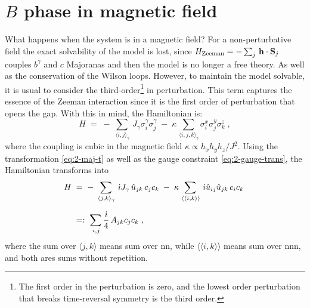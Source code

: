 


\section[B phase in a magnetic field]{$B$ phase in magnetic field}

What happens when the system is in a magnetic field? For a non-perturbative field the exact solvability of the model is lost, since $H_\text{Zeeman} = -\sum_j \,  \bf{h} \cdot \bf{S}_j $ couples $b^\gamma$ and $c$ Majoranas and then the model is no longer a free theory. As well as the conservation of the Wilson loops. %
However,  to maintain the model solvable, it is usual to consider the third-order\footnote{The first order in the  perturbation is zero, and the lowest order perturbation that breaks time-reversal symmetry is the third order.} in perturbation. This term captures the essence of the Zeeman interaction since it is the first order of perturbation that opens the gap. With this in mind, the Hamiltonian is: 
\begin{equation}
    H \; = \; -  \, \sum_{\, \langle i,j \rangle_{\gamma} }  \, J_{\gamma} \sigma_{i}^{\gamma} \sigma_{j}^{\gamma}    \; - \; \kappa  \sum_{ \,  \langle i,j,k \rangle_{\gamma} }   \sigma_{i}^{x} \sigma_{j}^{y} \sigma_{k}^{z} \; , \label{2-Ham-mag}
\end{equation} %
where the coupling is cubic in the magnetic field $\kappa \propto h_x h_y h_z/J^2$. %
Using the transformation \eqref{eq:2-maj-t} as well as the gauge constraint \eqref{eq:2-gauge-trans}, the Hamiltonian transforms into 
\begin{equation}
\begin{split}
    H \; & = \; -  \, \sum_{\, \langle j,k \rangle_{\gamma} }  \, \im J_{\gamma} \, \hat{u}_{jk} \, c_j c_k    \; - \; \kappa  \sum_{ \, \langle \langle i,k \rangle \rangle }   \, \im \hat{u}_{ij}\hat{u}_{jk} \,c_i c_k \;  \\[7pt]
   \; & =: \;  \sum_{\,i,j } \frac{\im }{ 4} \, A_{jk} c_j c_k \; , 
    \end{split}
\end{equation} where the sum over  $\langle j,k \rangle$ means sum over \acrlong{nn}, while $\langle \langle i,k \rangle \rangle$ means sum over \acrlong{nnn}, and both ares sums without repetition. 

